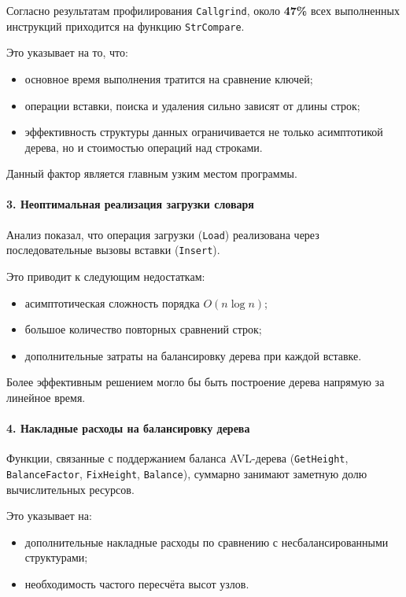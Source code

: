 \documentclass[12pt]{article}
\begin{document}
 Согласно результатам профилирования \texttt{Callgrind}, около \textbf{47\%} всех выполненных инструкций приходится на функцию \texttt{StrCompare}.
 
 Это указывает на то, что:
 \begin{itemize}
 	\item основное время выполнения тратится на сравнение ключей;
 	\item операции вставки, поиска и удаления сильно зависят от длины строк;
 	\item эффективность структуры данных ограничивается не только асимптотикой дерева, но и стоимостью операций над строками.
 \end{itemize}
 
 Данный фактор является главным узким местом программы.
 
 \paragraph{3. Неоптимальная реализация загрузки словаря}
 
 Анализ показал, что операция загрузки (\texttt{Load}) реализована через последовательные вызовы вставки (\texttt{Insert}).
 
 Это приводит к следующим недостаткам:
 \begin{itemize}
 	\item асимптотическая сложность порядка $O(n \log n)$;
 	\item большое количество повторных сравнений строк;
 	\item дополнительные затраты на балансировку дерева при каждой вставке.
 \end{itemize}
 
 Более эффективным решением могло бы быть построение дерева напрямую за линейное время.
 
 \paragraph{4. Накладные расходы на балансировку дерева}
 
 Функции, связанные с поддержанием баланса AVL-дерева (\texttt{GetHeight}, \texttt{BalanceFactor}, \texttt{FixHeight}, \texttt{Balance}), суммарно занимают заметную долю вычислительных ресурсов.
 
 Это указывает на:
 \begin{itemize}
 	\item дополнительные накладные расходы по сравнению с несбалансированными структурами;
 	\item необходимость частого пересчёта высот узлов.
 \end{itemize}
 
\end{document}
